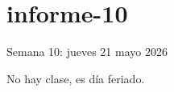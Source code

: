 \documentclass[./informes.tex]{subfiles}
\begin{document}
\chapter{informe-10}

Semana 10: jueves 21 mayo 2026

No hay clase, es día feriado.






\printbibliography[
  heading=subbibliography
]
\end{document}
